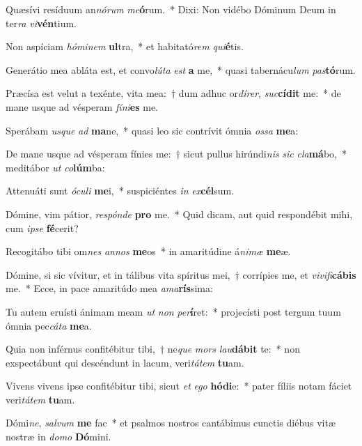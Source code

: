 \item Quæsívi resíduum an\textit{nó}\textit{rum} \textit{me}\textbf{ó}rum.~* Dixi: Non vidébo Dóminum Deum in ter\textit{ra} \textit{vi}\textbf{vén}tium.
\item Non aspíciam \textit{hó}\textit{mi}\textit{nem} \textbf{ul}tra,~* et habitató\textit{rem} \textit{qui}\textbf{é}tis.
\item Generátio mea abláta est, et convo\textit{lú}\textit{ta} \textit{est} \textbf{a} me,~* quasi tabernácu\textit{lum} \textit{pas}\textbf{tó}rum.
\item Præcísa est velut a texénte, vita mea:~† dum adhuc or\textit{dí}\textit{rer}, \textit{suc}\textbf{cí}\textbf{dit} me:~* de mane usque ad vésperam \textit{fí}\textit{ni}\textbf{es} me.
\item Sperábam \textit{us}\textit{que} \textit{ad} \textbf{ma}ne,~* quasi leo sic contrívit ómnia \textit{os}\textit{sa} \textbf{me}a:
\item De mane usque ad vésperam fínies me:~† sicut pullus hirúndi\textit{nis} \textit{sic} \textit{cla}\textbf{má}bo,~* meditábor \textit{ut} \textit{co}\textbf{lúm}ba:
\item Attenuáti sunt \textit{ó}\textit{cu}\textit{li} \textbf{me}i,~* suspiciéntes \textit{in} \textit{ex}\textbf{cél}sum.
\item Dómine, vim pátior, \textit{re}\textit{spón}\textit{de} \textbf{pro} me.~* Quid dicam, aut quid respondébit mihi, cum \textit{ip}\textit{se} \textbf{fé}cerit?
\item Recogitábo tibi om\textit{nes} \textit{an}\textit{nos} \textbf{me}os~* in amaritúdine á\textit{ni}\textit{mæ} \textbf{me}æ.
\item Dómine, si sic vívitur, et in tálibus vita spíritus mei,~† corrípies me, et \textit{vi}\textit{vi}\textit{fi}\textbf{cá}\textbf{bis} me.~* Ecce, in pace amaritúdo mea \textit{a}\textit{ma}\textbf{rís}sima:
\item Tu autem eruísti ánimam meam \textit{ut} \textit{non} \textit{per}\textbf{í}ret:~* projecísti post tergum tuum ómnia pec\textit{cá}\textit{ta} \textbf{me}a.
\item Quia non inférnus confitébitur tibi,~† ne\textit{que} \textit{mors} \textit{lau}\textbf{dá}\textbf{bit} te:~* non exspectábunt qui descéndunt in lacum, veri\textit{tá}\textit{tem} \textbf{tu}am.
\item Vivens vivens ipse confitébitur tibi, sicut \textit{et} \textit{e}\textit{go} \textbf{hó}\textbf{di}e:~* pater fíliis notam fáciet veri\textit{tá}\textit{tem} \textbf{tu}am.
\item Dómi\textit{ne}, \textit{sal}\textit{vum} \textbf{me} fac~* et psalmos nostros cantábimus cunctis diébus vitæ nostræ in \textit{do}\textit{mo} \textbf{Dó}mini.
